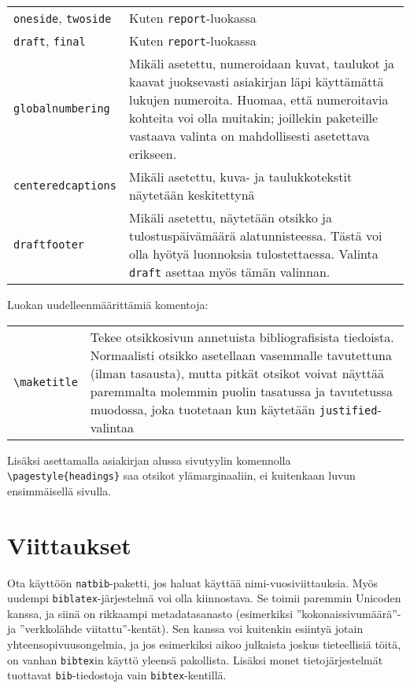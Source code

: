 \documentclass[globalnumbering,centeredcaptions]{tutthesis/tutthesis} %
\begin{document}
\begin{tabular}[h]{@{} p{} p{} @{}}
\texttt{oneside}, \texttt{twoside} & Kuten \texttt{report}-luokassa \\
\texttt{draft}, \texttt{final} & Kuten \texttt{report}-luokassa \\
\texttt{globalnumbering} & Mikäli asetettu, numeroidaan kuvat, taulukot ja kaavat juoksevasti asiakirjan läpi käyttämättä lukujen numeroita. Huomaa, että numeroitavia kohteita voi olla muitakin; joillekin paketeille vastaava valinta on mahdollisesti asetettava erikseen. \\
\texttt{centeredcaptions} & Mikäli asetettu, kuva- ja taulukkotekstit näytetään keskitettynä\\
\texttt{draftfooter} & Mikäli asetettu, näytetään otsikko ja tulostuspäivämäärä alatunnisteessa. Tästä voi olla hyötyä luonnoksia tulostettaessa. Valinta \texttt{draft} asettaa myös tämän valinnan.
\end{tabular}

Luokan uudelleenmäärittämiä komentoja:

\begin{tabular}[h]{@{} p{} p{} @{}}
  \verb|\maketitle| & Tekee otsikkosivun annetuista bibliografisista tiedoista. Normaalisti otsikko asetellaan vasemmalle tavutettuna (ilman tasausta), mutta pitkät otsikot voivat näyttää paremmalta molemmin puolin tasatussa ja tavutetussa muodossa, joka tuotetaan kun käytetään \texttt{justified}-valintaa
\end{tabular}

Lisäksi asettamalla asiakirjan alussa sivutyylin komennolla \verb|\pagestyle{headings}| saa otsikot ylämarginaaliin, ei kuitenkaan luvun ensimmäisellä sivulla.

\section{Viittaukset}
Ota käyttöön \texttt{natbib}-paketti, jos haluat käyttää nimi-vuosiviittauksia.
Myös uudempi \texttt{biblatex}-järjestelmä voi olla kiinnostava.
Se toimii paremmin Unicoden kanssa, ja siinä on rikkaampi metadatasanasto (esimerkiksi ''kokonaissivumäärä''- ja ''verkkolähde viitattu''-kentät).
Sen kanssa voi kuitenkin esiintyä jotain yhteensopivuusongelmia, ja jos esimerkiksi aikoo julkaista joskus tieteellisiä töitä, on vanhan \texttt{bibtex}in käyttö yleensä pakollista.
Lisäksi monet tietojärjestelmät tuottavat \texttt{bib}-tiedostoja vain \texttt{bibtex}-kentillä.
\end{document}

